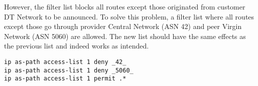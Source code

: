 However, the filter list blocks all routes except those originated from customer DT Network to be announced. To solve this problem, a filter list where all routes except those go through provider Central Network (ASN 42) and peer Virgin Network (ASN 5060) are allowed. The new list should have the same effects as the previous list and indeed works as intended.

\begin{lstlisting}
ip as-path access-list 1 deny _42_
ip as-path access-list 1 deny _5060_
ip as-path access-list 1 permit .*
\end{lstlisting}




